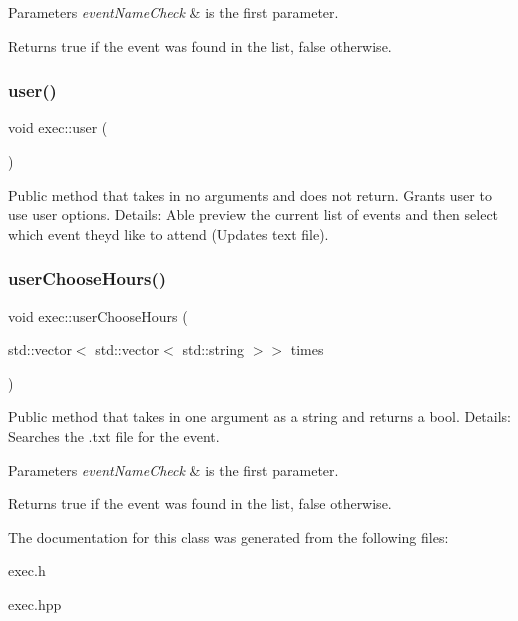 \begin{DoxyParams}{Parameters}
{\em event\+Name\+Check} & is the first parameter. \\
\hline
\end{DoxyParams}
\begin{DoxyReturn}{Returns}
true if the event was found in the list, false otherwise. 
\end{DoxyReturn}
\mbox{\label{classexec_a924407f4d277807e949aa9e97470f536}} 
\subsubsection{\texorpdfstring{user()}{user()}}
{\footnotesize\ttfamily void exec\+::user (\begin{DoxyParamCaption}{ }\end{DoxyParamCaption})}

Public method that takes in no arguments and does not return. Grants user to use user options. Details\+: Able preview the current list of events and then select which event they\textquotesingle{}d like to attend (Updates text file). \mbox{\label{classexec_a24fd11e0df1de9dee4fcc41623815aea}} 
\subsubsection{\texorpdfstring{user\+Choose\+Hours()}{userChooseHours()}}
{\footnotesize\ttfamily void exec\+::user\+Choose\+Hours (\begin{DoxyParamCaption}\item[{std\+::vector$<$ std\+::vector$<$ std\+::string $>$$>$}]{times }\end{DoxyParamCaption})}

Public method that takes in one argument as a string and returns a bool. Details\+: Searches the .txt file for the event. 
\begin{DoxyParams}{Parameters}
{\em event\+Name\+Check} & is the first parameter. \\
\hline
\end{DoxyParams}
\begin{DoxyReturn}{Returns}
true if the event was found in the list, false otherwise. 
\end{DoxyReturn}


The documentation for this class was generated from the following files\+:\begin{DoxyCompactItemize}
\item 
exec.\+h\item 
exec.\+hpp\end{DoxyCompactItemize}
